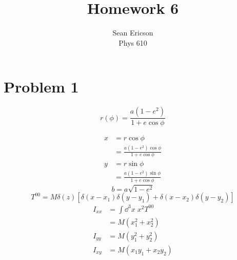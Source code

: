 \documentclass[12pt]{article}
\begin{document}
\title{Homework 6}
\author{Sean Ericson \\ Phys 610}
\maketitle

\section*{Problem 1}
\[ r(\phi) = \frac{a(1-e^2)}{1 + e\cos\phi} \]

\begin{align*}
    x &= r\cos\phi \\
    &= \frac{a(1-e^2)\cos\phi}{1 + e\cos\phi} \\
    y &= r\sin\phi \\
    &= \frac{a(1-e^2)\sin\phi}{1 + e\cos\phi}
\end{align*}
\[ b = a\sqrt{1 - e^2} \]
\[ T^{00} = M\delta(z)\left[\delta(x-x_1)\delta(y-y_1) + \delta(x-x_2)\delta(y-y_2)\right] \]
\begin{align*}
    I_{xx} &= \int\dd^3x\; x^2T^{00} \\
    &= M(x_1^2 + x_2^2) \\
    I_{yy} &= M(y_1^2 + y_2^2)\\
    I_{xy} &= M(x_1y_1 + x_2y_2)
\end{align*}
\end{document}

